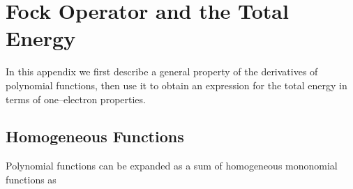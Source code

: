\documentclass[aps,preprint]{revtex4}%
\begin{document}
\section{\bigskip Fock Operator and the Total Energy\label{Fock&Energy}}

In this appendix we first describe a general property of the derivatives of
polynomial functions, then use it to obtain an expression for the total energy
in terms of one--electron properties.

\subsection{Homogeneous Functions\label{HomFunc}}

Polynomial functions can be expanded as a sum of homogeneous mononomial
functions as%
\end{document}
